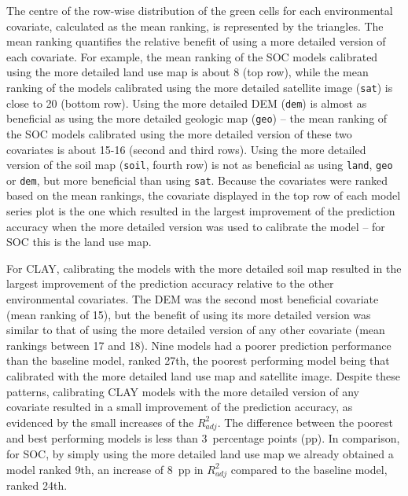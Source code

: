 The centre of the row-wise distribution of the green cells for each 
environmental covariate, calculated as the mean ranking, is represented by the 
triangles. The mean ranking quantifies the relative benefit of using a more 
detailed version of each covariate. For example, the mean ranking of the SOC 
models calibrated using the more detailed land use map is about 8 (top row), 
while the mean ranking of the models calibrated using the more detailed 
satellite image (\texttt{sat}) is close to 20 (bottom row). Using the more 
detailed DEM (\texttt{dem}) is almost as beneficial as using the more detailed 
geologic map (\texttt{geo}) -- the mean ranking of the SOC models calibrated 
using the more detailed version of these two covariates is about 15-16 (second 
and third rows). Using the more detailed version of the soil map (\texttt{soil},
fourth row) is not as beneficial as using \texttt{land}, \texttt{geo} or 
\texttt{dem}, but more beneficial than using \texttt{sat}. Because the 
covariates were ranked based on the mean rankings, the covariate displayed in 
the top row of each model series plot is the one which resulted in the largest
improvement of the prediction accuracy when the more detailed version was used 
to calibrate the model -- for SOC this is the land use map.

For CLAY, calibrating the models with the more detailed soil map resulted in 
the largest improvement of the prediction accuracy relative to the other 
environmental covariates. The DEM was the second most beneficial covariate (mean
ranking of 15), but the benefit of using its more detailed version was similar 
to that of using the more detailed version of any other covariate (mean rankings
between 17 and 18). Nine models had a poorer prediction performance than the 
baseline model, ranked 27th, the poorest performing model being that calibrated 
with the more detailed land use map and satellite image. Despite these patterns,
calibrating CLAY models with the more detailed version of any covariate resulted
in a small improvement of the prediction accuracy, as evidenced by the small 
increases of the ${R}^{2}_{adj}$. The difference between the poorest and best
performing models is less than 3~percentage points (pp). In comparison, for 
SOC, by simply using the more detailed land use map we already obtained a model
ranked 9th, an increase of 8~pp in ${R}^{2}_{adj}$ compared to the baseline 
model, ranked 24th.


